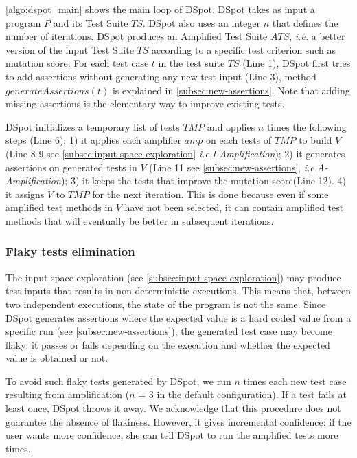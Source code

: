 \documentclass[table,xcdraw,smallextended]{svjour3}
\newcommand{\Iampl}{\emph{I-Amplification}\xspace}
\newcommand{\Aampl}{\emph{A-Amplification}\xspace}
\newcommand{\ie}{\textit{i.e.}\xspace}
\newcommand{\dspot}{DSpot\xspace}
\newcommand{\ms}{mutation score\xspace}
\begin{document}
\autoref{algo:dspot_main} shows the main loop of \dspot. 
\dspot takes as input a program $P$ and its Test Suite $TS$. \dspot also uses an integer $n$ that defines the number of iterations.
\dspot produces an Amplified Test Suite $ATS$, \ie a better version of the input Test Suite $TS$ according to a specific test criterion such as \ms.
For each test case $t$ in the test suite $TS$ (Line 1), \dspot first tries to add assertions without generating any new test input (Line 3),  method $generateAssertions\left(t\right)$ is explained in \autoref{subsec:new-assertions}.
Note that adding missing assertions is the elementary way to improve existing tests.

\dspot initializes a temporary list of tests $TMP$ and applies $n$ times the following steps (Line 6): 
1) it applies each amplifier $amp$ on each tests of $TMP$ to build $V$ (Line 8-9 see \autoref{subsec:input-space-exploration} \ie \Iampl);
2) it generates assertions on generated tests in $V$ (Line 11 see \autoref{subsec:new-assertions}, \ie \Aampl);
3) it keeps the tests that improve the \ms (Line 12).
4) it assigns $V$ to $TMP$ for the next iteration. This is done because even if some amplified test methods in $V$ have not been selected, it can contain amplified test methods that will eventually be better in subsequent iterations.


\subsubsection{Flaky tests elimination}
The input space exploration (see \autoref{subsec:input-space-exploration}) may produce test inputs that results in non-deterministic executions.
This means that, between two independent executions, the state of the program is not the same.
Since \dspot generates assertions where the expected value is a hard coded value from a specific run (see \autoref{subsec:new-assertions}), the generated test case may become flaky: it passes or fails depending on the execution and whether the expected value is obtained or not.

To avoid such flaky tests generated by \dspot, we run $n$ times each new test case resulting from amplification ($n$ = 3 in the default configuration). 
If a test fails at least once, \dspot throws it away. 
We acknowledge that this procedure does not guarantee the absence of flakiness. 
However, it gives incremental confidence: if the user wants more confidence, she can tell \dspot to run the amplified tests more times.
\end{document}

